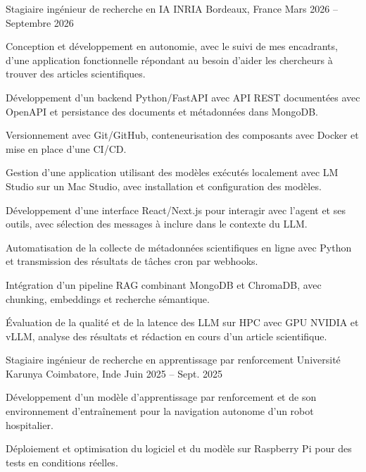 
\begin{cventries}
  \cventry
    {Stagiaire ingénieur de recherche en IA}
    {INRIA}
    {Bordeaux, France}
    {Mars 2026 -- Septembre 2026}
    {
      \begin{cvitems}
        \item {Conception et développement en autonomie, avec le suivi de mes encadrants, d’une application fonctionnelle répondant au besoin d’aider les chercheurs à trouver des articles scientifiques.}
        \item {Développement d’un backend Python/FastAPI avec API REST documentées avec OpenAPI et persistance des documents et métadonnées dans MongoDB.}
        \item {Versionnement avec Git/GitHub, conteneurisation des composants avec Docker et mise en place d’une CI/CD.}
        \item {Gestion d’une application utilisant des modèles exécutés localement avec LM Studio sur un Mac Studio, avec installation et configuration des modèles.}
        \item {Développement d’une interface React/Next.js pour interagir avec l’agent et ses outils, avec sélection des messages à inclure dans le contexte du LLM.}
        \item {Automatisation de la collecte de métadonnées scientifiques en ligne avec Python et transmission des résultats de tâches cron par webhooks.}
        \item {Intégration d’un pipeline RAG combinant MongoDB et ChromaDB, avec chunking, embeddings et recherche sémantique.}
        \item {Évaluation de la qualité et de la latence des LLM sur HPC avec GPU NVIDIA et vLLM, analyse des résultats et rédaction en cours d’un article scientifique.}
      \end{cvitems}
    }

  \cventry
    {Stagiaire ingénieur de recherche en apprentissage par renforcement}
    {Université Karunya}
    {Coimbatore, Inde}
    {Juin 2025 -- Sept. 2025}
    {
      \begin{cvitems}
        \item {Développement d’un modèle d’apprentissage par renforcement et de son environnement d’entraînement pour la navigation autonome d’un robot hospitalier.}
        \item {Déploiement et optimisation du logiciel et du modèle sur Raspberry Pi pour des tests en conditions réelles.}
      \end{cvitems}
    }
\end{cventries}
